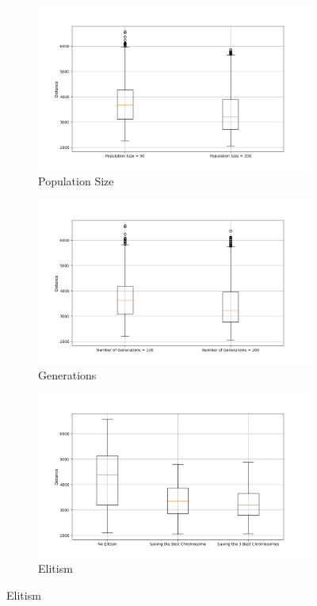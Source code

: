 \documentclass[11pt]{article}
\begin{document}
\begin{figure}[H]
    \centering
    \begin{subfigure}{0.3\textwidth}
        \includegraphics[width=\textwidth]{../results/population_size_boxplot.png}
        \caption{Population Size}
        \label{fig:population_size}
    \end{subfigure}
    \begin{subfigure}{0.3\textwidth}
        \includegraphics[width=\textwidth]{../results/generations_boxplot.png}
        \caption{Generations}
        \label{fig:generations}
    \end{subfigure}
    \begin{subfigure}{0.3\textwidth}
        \includegraphics[width=\textwidth]{../results/elitism_boxplot.png}
        \caption{Elitism}
        \label{fig:elitism}
    \end{subfigure}
\end{figure}
\end{document}
